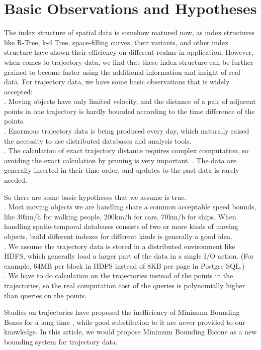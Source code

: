 \documentclass[sigplan]{acmart}
\begin{document}
\section{Basic Observations and Hypotheses}
The index structure of spatial data is somehow matured now, as index structures like R-Tree, k-d Tree, space-filling curves, their variants, and other index structure have shown their efficiency on different realms in application. However, when comes to trajectory data, we find that these index structure can be further grained to become faster using the additional information and insight of real data. For trajectory data, we have some basic observations that is widely accepted: \\
. Moving objects have only limited velocity, and the distance of a pair of adjacent points in one trajectory is hardly bounded according to the time difference of the points.\\
. Enormous trajectory data is being produced every day, which naturally raised the necessity to use distributed databases and analysis tools.\\
. The calculation of exact trajectory distance requires complex computation, so avoiding the exact calculation by pruning is very important.
. The data are generally inserted in their time order, and updates to the past data is rarely needed.\\
\par
So there are some basic hypotheses that we assume is true.\\
. Most moving objects we are handling share a common acceptable speed bounds, like 30km/h for walking people, 200km/h for cars, 70km/h for ships. When handling spatio-temporal databases consists of two or more kinds of moving objects, build different indexes for different kinds is generally a good idea.\\
. We assume the trajectory data is stored in a distributed environment like HDFS, which generally load a larger part of the data in a single I/O action. (For example, 64MB per block in HDFS instead of 8KB per page in Postgre SQL.)\\
. We have to do calculation on the trajectories instead of the points in the trajectories, so the real computation cost of the queries is polynomially higher than queries on the points.\par

Studies on trajectories have proposed the inefficiency of Minimum Bounding Boxes for a long time \cite{pfoser2000novel}, while good substitution to it are never provided to our knowledge. In this article, we would propose Minimum Bounding Bicone as a new bounding system for trajectory data.\par
\end{document}
